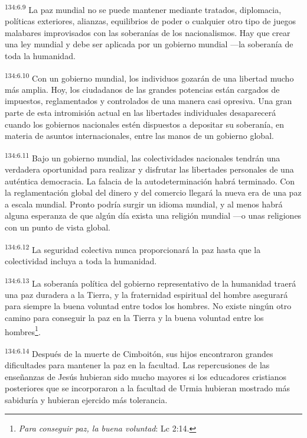 \par 
\textsuperscript{134:6.9} La paz mundial no se puede mantener mediante tratados, diplomacia, políticas exteriores, alianzas, equilibrios de poder o cualquier otro tipo de juegos malabares improvisados con las soberanías de los nacionalismos. Hay que crear una ley mundial y debe ser aplicada por un gobierno mundial ---la soberanía de toda la humanidad.

\par 
\textsuperscript{134:6.10} Con un gobierno mundial, los individuos gozarán de una libertad mucho más amplia. Hoy, los ciudadanos de las grandes potencias están cargados de impuestos, reglamentados y controlados de una manera casi opresiva. Una gran parte de esta intromisión actual en las libertades individuales desaparecerá cuando los gobiernos nacionales estén dispuestos a depositar su soberanía, en materia de asuntos internacionales, entre las manos de un gobierno global.

\par 
\textsuperscript{134:6.11} Bajo un gobierno mundial, las colectividades nacionales tendrán una verdadera oportunidad para realizar y disfrutar las libertades personales de una auténtica democracia. La falacia de la autodeterminación habrá terminado. Con la reglamentación global del dinero y del comercio llegará la nueva era de una paz a escala mundial. Pronto podría surgir un idioma mundial, y al menos habrá alguna esperanza de que algún día exista una religión mundial ---o unas religiones con un punto de vista global.

\par 
\textsuperscript{134:6.12} La seguridad colectiva nunca proporcionará la paz hasta que la colectividad incluya a toda la humanidad.

\par 
\textsuperscript{134:6.13} La soberanía política del gobierno representativo de la humanidad traerá una paz duradera a la Tierra, y la fraternidad espiritual del hombre asegurará para siempre la buena voluntad entre todos los hombres. No existe ningún otro camino para conseguir la paz en la Tierra y la buena voluntad entre los hombres\footnote{\textit{Para conseguir paz, la buena voluntad}: Lc 2:14.}.

\par 
\textsuperscript{134:6.14} Después de la muerte de Cimboitón, sus hijos encontraron grandes dificultades para mantener la paz en la facultad. Las repercusiones de las enseñanzas de Jesús hubieran sido mucho mayores si los educadores cristianos posteriores que se incorporaron a la facultad de Urmia hubieran mostrado más sabiduría y hubieran ejercido más tolerancia.

